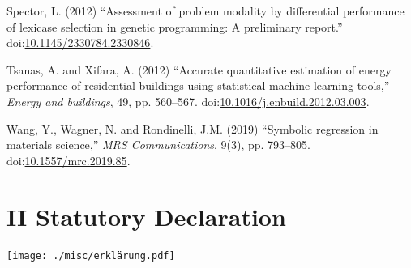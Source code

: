\documentclass[
  12pt,
]{article}
\newlength{\cslhangindent}
\newlength{\cslentryspacingunit} %
\newenvironment{CSLReferences}[2] %
 {%
  \setlength{\parindent}{0pt}
  \ifodd #1
  \let\oldpar\par
  \def\par{\hangindent=\cslhangindent\oldpar}
  \fi
  \setlength{\parskip}{#2\cslentryspacingunit}
 }%
 {}
\begin{document}
\begin{CSLReferences}{0}{0}
\leavevmode{}%
Spector, L. (2012) {``Assessment of problem modality by differential
performance of lexicase selection in genetic programming: A preliminary
report.''}
doi:\href{https://doi.org/10.1145/2330784.2330846}{10.1145/2330784.2330846}.

\leavevmode{}%
Tsanas, A. and Xifara, A. (2012) {``Accurate quantitative estimation of
energy performance of residential buildings using statistical machine
learning tools,''} \emph{Energy and buildings}, 49, pp. 560--567.
doi:\href{https://doi.org/10.1016/j.enbuild.2012.03.003}{10.1016/j.enbuild.2012.03.003}.

\leavevmode{}%
Wang, Y., Wagner, N. and Rondinelli, J.M. (2019) {``Symbolic regression
in materials science,''} \emph{MRS Communications}, 9(3), pp. 793--805.
doi:\href{https://doi.org/10.1557/mrc.2019.85}{10.1557/mrc.2019.85}.

\end{CSLReferences}

\hypertarget{II}{%
\section*{II Statutory Declaration}\label{II}}

\texttt{[image: ./misc/erklärung.pdf]}\\
\end{document}

